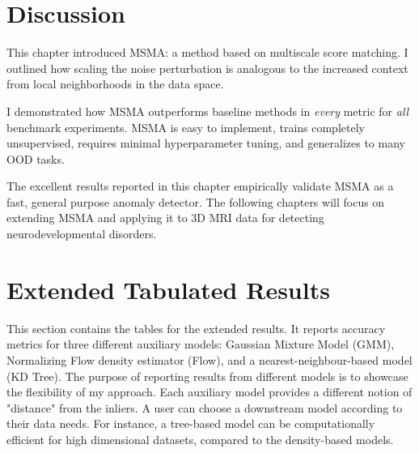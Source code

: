 
\section{Discussion}

This chapter introduced MSMA: a method based on multiscale score matching. I outlined how scaling the noise perturbation is analogous to the increased context from local neighborhoods in the data space.  


I demonstrated how MSMA outperforms baseline methods in \textit{every} metric for \textit{all} benchmark experiments. MSMA is easy to implement, trains completely unsupervised, requires minimal hyperparameter tuning, and generalizes to many OOD tasks.

The excellent results reported in this chapter empirically validate MSMA as a fast, general purpose anomaly detector. The following chapters will focus on extending MSMA and applying it to 3D MRI data for detecting neurodevelopmental disorders.

\section{Extended Tabulated Results}
\label{msma_extended_results}

This section contains the tables for the extended results. It reports accuracy metrics for three different auxiliary models: Gaussian Mixture Model (GMM), Normalizing Flow density estimator (Flow), and a nearest-neighbour-based model (KD Tree). The purpose of reporting results from different models is to showcase the flexibility of my approach. Each auxiliary model provides a different notion of "distance" from the inliers. A user can choose a downstream model according to their data needs. For instance, a tree-based model can be computationally efficient for high dimensional datasets, compared to the density-based models.

